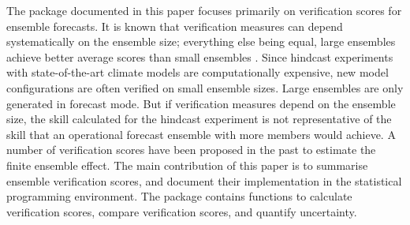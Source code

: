 \documentclass[article]{jss}\usepackage{graphicx, color}
\begin{document}
The  package  documented in this paper focuses primarily on verification scores for ensemble forecasts.
It is known that verification measures can depend systematically on the ensemble size; everything else being equal, large ensembles achieve better average scores than small ensembles \citep{buizza1998impact}.
Since hindcast experiments with state-of-the-art climate models are computationally expensive, 
new model configurations are often verified on small ensemble sizes.
Large ensembles are only generated in forecast mode.
But if verification measures depend on the ensemble size, the skill calculated for the hindcast experiment is not representative of the skill that an operational forecast ensemble with more members would achieve.
A number of verification scores have been proposed in the past to estimate the finite ensemble effect.
The main contribution of this paper is to summarise ensemble verification scores, and document their implementation in the  statistical programming environment.
The package  contains functions to calculate verification scores, compare verification scores, and quantify uncertainty.
\end{document}
